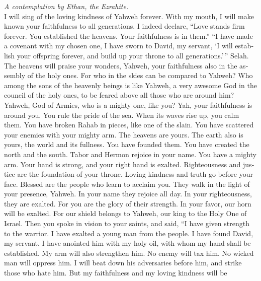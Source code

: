 \begin{paracol}{2}
\begin{otherlanguage}{english}
\emph{A contemplation by Ethan, the Ezrahite.}\\
 I will sing of the loving kindness of Yahweh forever.
With my mouth, I will make known your faithfulness to all generations.
 I indeed declare, ``Love stands firm forever. You
established the heavens. Your faithfulness is in them.'' 
``I have made a covenant with my chosen one, I have sworn to David, my
servant,  `I will establish your offspring forever, and
build up your throne to all generations.'\,'' Selah.  The
heavens will praise your wonders, Yahweh, your faithfulness also in the
assembly of the holy ones.  For who in the skies can be
compared to Yahweh? Who among the sons of the heavenly beings is like
Yahweh,  a very awesome God in the council of the holy
ones, to be feared above all those who are around him? 
Yahweh, God of Armies, who is a mighty one, like you? Yah, your
faithfulness is around you.  You rule the pride of the
sea. When its waves rise up, you calm them.  You have
broken Rahab in pieces, like one of the slain. You have scattered your
enemies with your mighty arm.  The heavens are yours. The
earth also is yours, the world and its fullness. You have founded them.
 You have created the north and the south. Tabor and
Hermon rejoice in your name.  You have a mighty arm. Your
hand is strong, and your right hand is exalted. 
Righteousness and justice are the foundation of your throne. Loving
kindness and truth go before your face.  Blessed are the
people who learn to acclaim you. They walk in the light of your
presence, Yahweh.  In your name they rejoice all day. In
your righteousness, they are exalted.  For you are the
glory of their strength. In your favor, our horn will be exalted.
 For our shield belongs to Yahweh, our king to the Holy
One of Israel.  Then you spoke in vision to your saints,
and said, ``I have given strength to the warrior. I have exalted a young
man from the people.  I have found David, my servant. I
have anointed him with my holy oil,  with whom my hand
shall be established. My arm will also strengthen him. 
No enemy will tax him. No wicked man will oppress him.  I
will beat down his adversaries before him, and strike those who hate
him.  But my faithfulness and my loving kindness will be

\end{otherlanguage}
\end{paracol}
